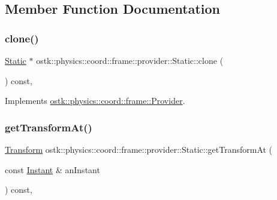 \subsection{Member Function Documentation}
\mbox{\label{classostk_1_1physics_1_1coord_1_1frame_1_1provider_1_1_static_a3e25a6fc979fc4ac28d8cbea4835ea71}} 
\subsubsection{\texorpdfstring{clone()}{clone()}}
{\footnotesize\ttfamily \hyperlink{classostk_1_1physics_1_1coord_1_1frame_1_1provider_1_1_static}{Static} $\ast$ ostk\+::physics\+::coord\+::frame\+::provider\+::\+Static\+::clone (\begin{DoxyParamCaption}{ }\end{DoxyParamCaption}) const\hspace{0.3cm}{\ttfamily [override]}, {\ttfamily [virtual]}}



Implements \hyperlink{classostk_1_1physics_1_1coord_1_1frame_1_1_provider_ae41bc3862d088e9c8d90a79253294ce9}{ostk\+::physics\+::coord\+::frame\+::\+Provider}.

\mbox{\label{classostk_1_1physics_1_1coord_1_1frame_1_1provider_1_1_static_a0fbed95f9f17a51aca6d8f83c9532510}} 
\subsubsection{\texorpdfstring{get\+Transform\+At()}{getTransformAt()}}
{\footnotesize\ttfamily \hyperlink{classostk_1_1physics_1_1coord_1_1_transform}{Transform} ostk\+::physics\+::coord\+::frame\+::provider\+::\+Static\+::get\+Transform\+At (\begin{DoxyParamCaption}\item[{const \hyperlink{classostk_1_1physics_1_1time_1_1_instant}{Instant} \&}]{an\+Instant }\end{DoxyParamCaption}) const\hspace{0.3cm}{\ttfamily [override]}, {\ttfamily [virtual]}}



